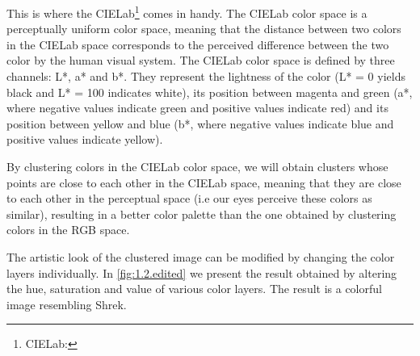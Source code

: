 \documentclass[tikz,14pt,fleqn]{article}
\begin{document}
This is where the CIELab\footnote{CIELab: } comes in handy. The CIELab color space is a perceptually uniform color space, meaning that the distance between two colors in the CIELab space corresponds to the perceived difference between the two color by the human visual system. The CIELab color space is defined by three channels: L*, a* and b*. They represent the lightness of the color (L* = 0 yields black and L* = 100 indicates white), its position between magenta and green (a*, where negative values indicate green and positive values indicate red) and its position between yellow and blue (b*, where negative values indicate blue and positive values indicate yellow).

By clustering colors in the CIELab color space, we will obtain clusters whose points are close to each other in the CIELab space, meaning that they are close to each other in the perceptual space (i.e our eyes perceive these colors as similar), resulting in a better color palette than the one obtained by clustering colors in the RGB space.


The artistic look of the clustered image can be modified by changing the color layers individually. In \autoref{fig:1.2.edited} we present the result obtained by altering the hue, saturation and value of various color layers. The result is a colorful image resembling Shrek.
\end{document}
